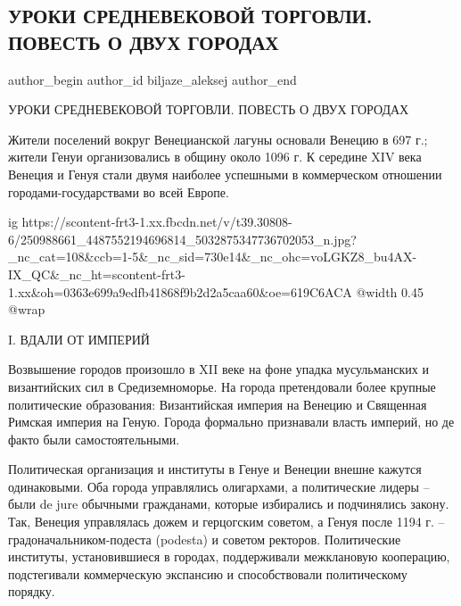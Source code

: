  
 
 
 
 
 
\subsection{УРОКИ СРЕДНЕВЕКОВОЙ ТОРГОВЛИ. ПОВЕСТЬ О ДВУХ ГОРОДАХ}
\label{sec:02_11_2021.fb.biljaze_aleksej.1.povest_o_dvuh_gorodah}
 
\ifcmt
 author_begin
   author_id biljaze_aleksej
 author_end
\fi

УРОКИ СРЕДНЕВЕКОВОЙ ТОРГОВЛИ. ПОВЕСТЬ О ДВУХ ГОРОДАХ

Жители поселений вокруг Венецианской лагуны основали Венецию в 697 г.; жители
Генуи организовались в общину около 1096 г. К середине XIV века Венеция и Генуя
стали двумя наиболее успешными в коммерческом отношении городами-государствами
во всей Европе.

\ifcmt
  ig https://scontent-frt3-1.xx.fbcdn.net/v/t39.30808-6/250988661_4487552194696814_5032875347736702053_n.jpg?_nc_cat=108&ccb=1-5&_nc_sid=730e14&_nc_ohc=voLGKZ8_bu4AX-IX_QC&_nc_ht=scontent-frt3-1.xx&oh=0363e699a9edfb41868f9b2d2a5caa60&oe=619C6ACA
  @width 0.45
  @wrap 
\fi

I. ВДАЛИ ОТ ИМПЕРИЙ

Возвышение городов произошло в XII веке на фоне упадка мусульманских и
византийских сил в Средиземноморье. На города претендовали более крупные
политические образования: Византийская империя на Венецию и Священная Римская
империя на Геную. Города формально признавали власть империй, но де факто были
самостоятельными.

Политическая организация и институты в Генуе и Венеции внешне кажутся
одинаковыми. Оба города управлялись олигархами, а политические лидеры – были de
jure обычными гражданами, которые избирались и подчинялись закону. Так, Венеция
управлялась дожем и герцогским советом, а Генуя после 1194 г. –
градоначальником-подеста (podesta) и советом ректоров. Политические институты,
установившиеся в городах, поддерживали межклановую кооперацию, подстегивали
коммерческую экспансию и способствовали политическому порядку.

